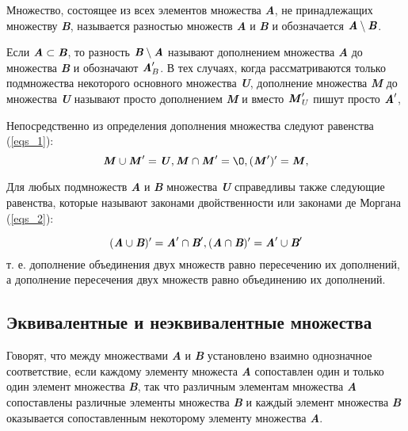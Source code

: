 \documentclass{article}
\begin{document}
    Множество, состоящее из всех элементов множества \textit{\textbf{A}}, не принадлежащих множеству \textit{\textbf{B}}, называется разностью множеств \textit{\textbf{A}} и \textit{\textbf{B}} и обозначается $\textbf{\textit{A}} \setminus \textbf{\textit{B}}$.

    Если $\textit{\textbf{A}} \subset \textit{\textbf{B}}$, то разность $\textbf{\textit{B}} \setminus \textbf{\textit{A}}$ называют дополнением множества \textit{\textbf{A}} до множества \textit{\textbf{B}} и обозначают $\textbf{\textit{A}}_B^\prime$.
    В тех случаях, когда рассматриваются только подмножества некоторого основного множества \textit{\textbf{U}}, дополнение множества \textit{\textbf{M}} до множества \textit{\textbf{U}} называют просто дополнением \textit{\textbf{M}} и вместо $\textbf{\textit{M}}_U^\prime$ пишут просто $\textbf{\textit{A}}^\prime$,

    Непосредственно из определения дополнения множества следуют равенства (\ref{eqs_1}):
    \begin{equation}
        \label{eqs_1}
        \textbf{\textit{M}} \cup \textbf{\textit{M}}^\prime = \textbf{\textit{U}}, \textbf{\textit{M}} \cap \textbf{\textit{M}}^\prime = \O, (\textbf{\textit{M}}^\prime)^\prime = \textbf{\textit{M}},
    \end{equation}

    Для любых подмножеств \textit{\textbf{A}} и \textit{\textbf{B}} множества \textit{\textbf{U}} справедливы
    также следующие равенства, которые называют законами двойственности или законами де Моргана (\ref{eqs_2}):

    \begin{equation}
        \label{eqs_2}
        (\textit{\textbf{A}} \cup \textit{\textbf{B}})^\prime = \textit{\textbf{A}}^\prime \cap \textit{\textbf{B}}^\prime, (\textit{\textbf{A}} \cap \textit{\textbf{B}})^\prime = \textit{\textbf{A}}^\prime \cup \textit{\textbf{B}}^\prime
    \end{equation}
    т. е. дополнение объединения двух множеств равно пересечению их
    дополнений, а дополнение пересечения двух множеств равно объединению их дополнений.

    \subsection*{Эквивалентные и неэквивалентные множества}

    \fontsize{13}{10}\selectfont Говорят, что между множествами \textit{\textbf{A}} и \textit{\textbf{B}} установлено взаимно однозначное соответствие, если каждому элементу множеста \textit{\textbf{A}} сопоставлен один и только один элемент множества \textit{\textbf{B}}, так что различным элементам множества \textit{\textbf{A}} сопоставлены различные элементы
    множества \textit{\textbf{B}} и каждый элемент множества \textit{\textbf{B}} оказывается сопоставленным некоторому элементу множества \textit{\textbf{A}}.
\end{document}
